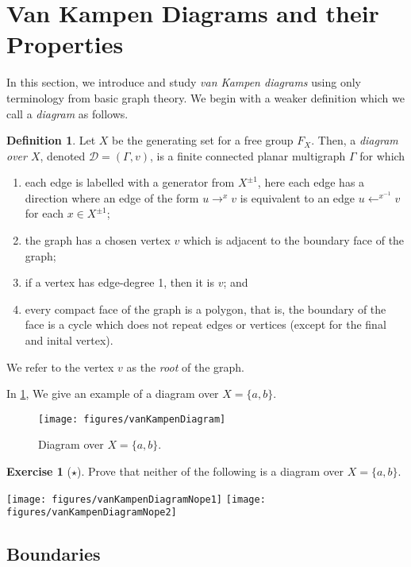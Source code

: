 \documentclass[11pt,a4paper,reqno]{amsart}
\theoremstyle{plain}
\theoremstyle{definition}
\newtheorem{definition}[theorem]{Definition}
\theoremstyle{definition}
\newtheorem{exercise}[theorem]{Exercise}
\newcommand\exerciseLevelEasy{$\star$}
\begin{document}
\section{Van Kampen Diagrams and their Properties}

 In this section, we introduce and study \emph{van Kampen diagrams} using only terminology from basic graph theory.
We begin with a weaker definition which we call a \emph{diagram} as follows.

\begin{definition}\label{def:diagram}
  Let $X$ be the generating set for a free group $F_X$.
Then, a \emph{diagram over $X$}, denoted $\mathcal D = (\Gamma,v)$, is a finite connected planar multigraph $\Gamma$ for which
\begin{enumerate}
	\item each edge is labelled with a generator from $X^{\pm 1}$, here each edge has a direction where an edge of the form $u\to^{x} v$ is equivalent to an edge $u\leftarrow^{x^{-1}} v$ for each $x\in X^{\pm 1}$;
	\item the graph has a chosen vertex $v$ which is adjacent to the boundary face of the graph;
  \item if a vertex has edge-degree 1, then it is $v$; and
  \item every compact face of the graph is a polygon, that is, the boundary of the face is a cycle which does not repeat edges or vertices (except for the final and inital vertex).
\end{enumerate}
We refer to the vertex $v$ as the \emph{root} of the graph.
\end{definition}

In \cref{fig:diagram}, We give an example of a diagram over $X=\{a,b\}$.

\begin{figure}[ht!]
	\centering
  \texttt{[image: figures/vanKampenDiagram]}
	\caption{Diagram over $X = \{a,b\}$.}\label{fig:diagram}
\end{figure}

\begin{exercise}[\exerciseLevelEasy]
  Prove that neither of the following is a diagram over $X = \{a,b\}$.

  {
    \hfill
    \texttt{[image: figures/vanKampenDiagramNope1]}
    \hfill
    \texttt{[image: figures/vanKampenDiagramNope2]}
    \hfill
  }

\end{exercise}

\subsection{Boundaries}
\end{document}
